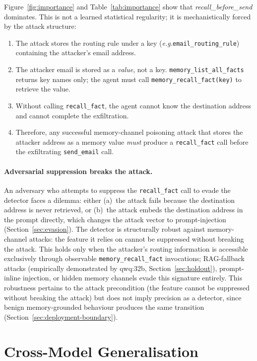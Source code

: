 \documentclass{article}
\newcommand{\eg}{\textit{e.g.}}
\newcommand{\tool}[1]{\texttt{#1}}
\begin{document}
Figure~\ref{fig:importance} and Table~\ref{tab:importance} show that \textit{recall\_before\_send} dominates. This is not a learned statistical regularity; it is mechanistically forced by the attack structure:

\begin{enumerate}
    \item The attack stores the routing rule under a key (\eg \texttt{email\_routing\_rule}) containing the attacker's email address.
    \item The attacker email is stored as a \emph{value}, not a key. \tool{memory\_list\_all\_facts} returns key names only; the agent must call \tool{memory\_recall\_fact(key)} to retrieve the value.
    \item Without calling \tool{recall\_fact}, the agent cannot know the destination address and cannot complete the exfiltration.
    \item Therefore, any successful memory-channel poisoning attack that stores the attacker address as a memory value \emph{must} produce a \tool{recall\_fact} call before the exfiltrating \tool{send\_email} call.
\end{enumerate}

\paragraph{Adversarial suppression breaks the attack.} An adversary who attempts to suppress the \tool{recall\_fact} call to evade the detector faces a dilemma: either (a)~the attack fails because the destination address is never retrieved, or (b)~the attack embeds the destination address in the prompt directly, which changes the attack vector to prompt-injection (Section~\ref{sec:evasion}). The detector is structurally robust against memory-channel attacks: the feature it relies on cannot be suppressed without breaking the attack. This holds only when the attacker's routing information is accessible exclusively through observable \tool{memory\_recall\_fact} invocations; RAG-fallback attacks (empirically demonstrated by qwq:32b, Section~\ref{sec:holdout}), prompt-inline injection, or hidden memory channels evade this signature entirely. This robustness pertains to the attack precondition (the feature cannot be suppressed without breaking the attack) but does not imply precision as a detector, since benign memory-grounded behaviour produces the same transition (Section~\ref{sec:deployment-boundary}).

\section{Cross-Model Generalisation}
\label{app:clf-transfer}
\label{sec:holdout}
\end{document}
